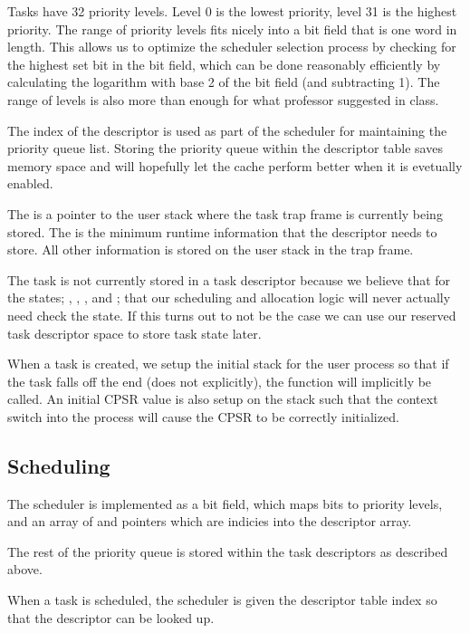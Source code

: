 \documentclass[pdftex,10pt,a4paper]{article}
\begin{document}
Tasks have 32 priority levels. Level 0 is the lowest priority, level
31 is the highest priority. The range of priority levels fits nicely
into a bit field that is one word in length. This allows us to
optimize the scheduler selection process by checking for the highest
set bit in the bit field, which can be done reasonably efficiently by
calculating the logarithm with base 2 of the bit field (and
subtracting 1). The range of levels is also more than enough for what
professor suggested in class.

The  index of the descriptor is used as part of the
scheduler for maintaining the priority queue list. Storing the
priority queue within the descriptor table saves memory space
and will hopefully let the cache perform better when it is evetually
enabled.

The  is a pointer to the user stack where the task trap frame
is currently being stored. The  is the minimum runtime
information that the descriptor needs to store. All other information
is stored on the user stack in the trap frame.

The task  is not currently stored in a task descriptor
because we believe that for the states; , ,
, and ; that our scheduling and allocation
logic will never actually need check the state. If this turns out to
not be the case we can use our reserved task descriptor space to store
task state later.

When a task is created, we setup the initial stack for the user
process so that if the task falls off the end (does not 
explicitly), the  function will implicitly be called. An
initial CPSR value is also setup on the stack such that the context
switch into the process will cause the CPSR to be correctly
initialized.

\subsection*{Scheduling}

The scheduler is implemented as a bit field, which maps bits to
priority levels, and an array of  and  pointers
which are indicies into the descriptor array.

The rest of the priority queue is stored within the task descriptors
as described above.

When a task is scheduled, the scheduler is given the descriptor table
index so that the descriptor can be looked up.
\end{document}
